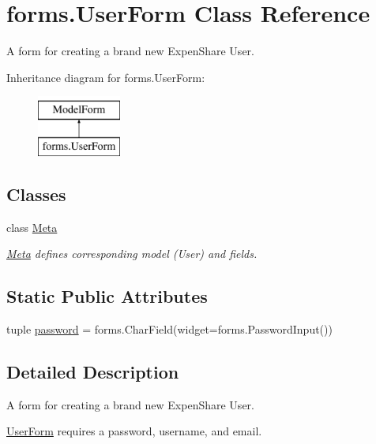 \hypertarget{classforms_1_1_user_form}{\section{forms.\-User\-Form Class Reference}
\label{classforms_1_1_user_form}
}


A form for creating a brand new Expen\-Share User.  


Inheritance diagram for forms.\-User\-Form\-:\begin{figure}[H]
\begin{center}
\leavevmode
\includegraphics[height=2.000000cm]{classforms_1_1_user_form}
\end{center}
\end{figure}
\subsection*{Classes}
\begin{DoxyCompactItemize}
\item 
class \hyperlink{classforms_1_1_user_form_1_1_meta}{Meta}
\begin{DoxyCompactList}\small\item\em \hyperlink{classforms_1_1_user_form_1_1_meta}{Meta} defines corresponding model (User) and fields. \end{DoxyCompactList}\end{DoxyCompactItemize}
\subsection*{Static Public Attributes}
\begin{DoxyCompactItemize}
\item 
tuple \hyperlink{classforms_1_1_user_form_af36c6d916f8374e9c6940810af92d95e}{password} = forms.\-Char\-Field(widget=forms.\-Password\-Input())
\end{DoxyCompactItemize}


\subsection{Detailed Description}
A form for creating a brand new Expen\-Share User. 

\hyperlink{classforms_1_1_user_form}{User\-Form} requires a password, username, and email. 

